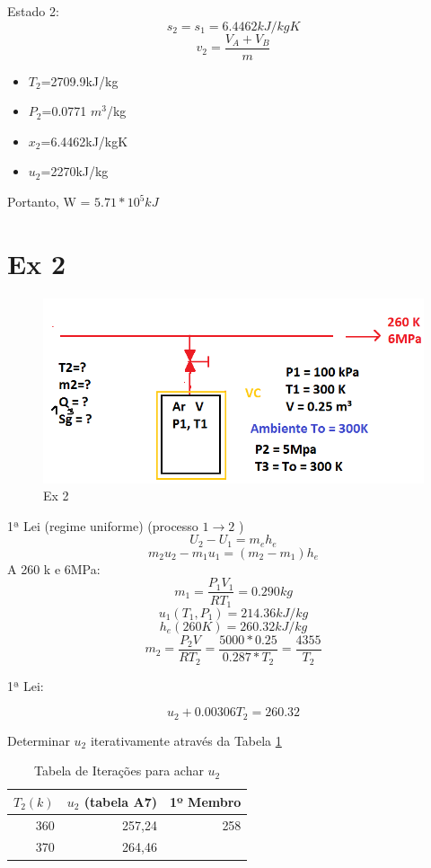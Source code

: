 \documentclass[a4paper, 12pt]{article}
\begin{document}
Estado 2:
\[s_{2}=s_{1}=6.4462 kJ/kgK\]
\[v_{2}=\frac{V_{A}+V_{B}}{m}\]
\begin{itemize}
\item $T_{2}$=2709.9kJ/kg
\item $P_{2}$=0.0771 $m^{3}$/kg
\item $x_{2}$=6.4462kJ/kgK
\item $u_{2}$=2270kJ/kg
\end{itemize}
Portanto, W = $5.71 * 10^{5} kJ$

\section{Ex 2} 
\begin{figure}[h]
\begin{center}
\includegraphics[scale=0.58]{./fig/2.png}
\caption{\label{fig:2}Ex 2} 
\end{center}
\end{figure}

1ª Lei (regime uniforme) (processo $1 \rightarrow 2$ )
\[U_{2}-U_{1}=m_{e}h_{e}\]
\[m_{2}u_{2}-m_{1}u_{1}=(m_{2}-m_{1})h_{e}\]
A 260 k e 6MPa:
\[m_{1}=\frac{P_{1}V_{1}}{RT_{1}}=0.290kg\]
\[u_{1}(T_{1},P_{1})=214.36kJ/kg\]
\[h_{e}(260K)=260.32kJ/kg\]
\[m_{2}=\frac{P_{2}V}{RT_{2}}=\frac{5000*0.25}{0.287*T_{2}}=\frac{4355}{T_{2}}\]

1ª Lei:

\[u_{2}+0.00306 T_{2}=260.32\]

Determinar $u_{2}$ iterativamente através da Tabela \ref{tab:tab1}
\begin{table}[htbp]
  \centering
  \caption{Tabela de Iterações para achar $u_{2}$}
    \begin{tabular}{rrr}
    \toprule
    $T_{2}(k)$ & $u_{2}$ (tabela A7) & 1º Membro \\
    \midrule
    360   & 257,24 & 258 \\
    370   & 264,46 &  \\
    \bottomrule
    \end{tabular}%
  \label{tab:tab1}%
\end{table}%
\end{document}
